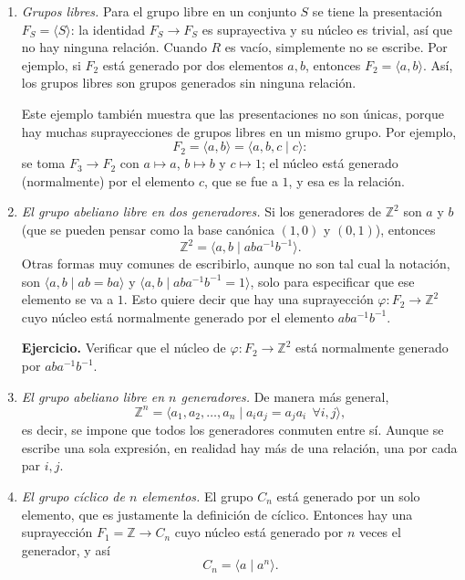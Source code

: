 \documentclass[11pt]{article}
\begin{document}
\begin{enumerate}
  \item \emph{Grupos libres.} Para el grupo libre en un conjunto $S$ se tiene la presentación $F_S=\langle S\rangle$: la identidad $F_S\to F_S$ es suprayectiva y su núcleo es trivial, así que no hay ninguna relación. Cuando $R$ es vacío, simplemente no se escribe. Por ejemplo, si $F_2$ está generado por dos elementos $a,b$, entonces $F_2=\langle a,b\rangle$. Así, los grupos libres son grupos generados sin ninguna relación.

  Este ejemplo también muestra que las presentaciones no son únicas, porque hay muchas suprayecciones de grupos libres en un mismo grupo. Por ejemplo,
  \[
    F_2=\langle a,b\rangle=\langle a,b,c\mid c\rangle:
  \]
  se toma $F_3\to F_2$ con $a\mapsto a$, $b\mapsto b$ y $c\mapsto1$; el núcleo está generado (normalmente) por el elemento $c$, que se fue a $1$, y esa es la relación.

  \item \emph{El grupo abeliano libre en dos generadores.} Si los generadores de $\mathbb{Z}^2$ son $a$ y $b$ (que se pueden pensar como la base canónica $(1,0)$ y $(0,1)$), entonces
  \[
    \mathbb{Z}^2=\langle a,b\mid aba^{-1}b^{-1}\rangle.
  \]
  Otras formas muy comunes de escribirlo, aunque no son tal cual la notación, son $\langle a,b\mid ab=ba\rangle$ y $\langle a,b\mid aba^{-1}b^{-1}=1\rangle$, solo para especificar que ese elemento se va a $1$. Esto quiere decir que hay una suprayección $\varphi\colon F_2\to\mathbb{Z}^2$ cuyo núcleo está normalmente generado por el elemento $aba^{-1}b^{-1}$.

  \noindent\textbf{Ejercicio.} Verificar que el núcleo de $\varphi\colon F_2\to\mathbb{Z}^2$ está normalmente generado por $aba^{-1}b^{-1}$.

  \item \emph{El grupo abeliano libre en $n$ generadores.} De manera más general,
  \[
    \mathbb{Z}^n=\langle a_1,a_2,\dots,a_n\mid a_ia_j=a_ja_i\ \ \forall i,j\rangle,
  \]
  es decir, se impone que todos los generadores conmuten entre sí. Aunque se escribe una sola expresión, en realidad hay más de una relación, una por cada par $i,j$.

  \item \emph{El grupo cíclico de $n$ elementos.} El grupo $C_n$ está generado por un solo elemento, que es justamente la definición de cíclico. Entonces hay una suprayección $F_1=\mathbb{Z}\to C_n$ cuyo núcleo está generado por $n$ veces el generador, y así
  \[
    C_n=\langle a\mid a^n\rangle.
  \]


\end{enumerate}
\end{document}
